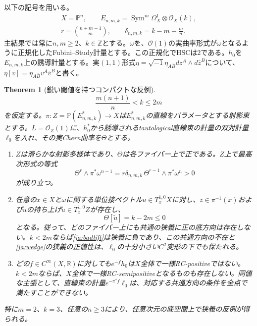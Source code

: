 \documentclass[12pt]{amsart}
\newtheorem{thm}{Theorem}[section]
\theoremstyle{definition}
\theoremstyle{remark}
\numberwithin{equation}{section}
\DeclareMathOperator{\Sym}{Sym}
\newcommand{\R}{\mathbb{R}}
\newcommand{\Z}{\mathbb{Z}}
\newcommand{\E}{E_{n,m,k}}
\newcommand{\Pp}{\mathbb P}
\newcommand{\cst}{\delta_{n,m,k}}
\newcommand{\jref}[1]{\eqref{ja:#1}}
\begin{document}
以下の記号を用いる。
\begin{equation}\label{ja:parameters}
\begin{gathered}
X=\Pp^n,\qquad
\E=\Sym^m\Omega_X^1\otimes\mathcal O_X(k),\\
r=\binom{n+m-1}{m},\qquad
\cst=k-m-\frac mn.
\end{gathered}
\end{equation}
主結果では常に$n,m\ge2$、$k\in\Z$とする。$\omega$を、$\mathcal O(1)$の実曲率形式が$\omega$となるように正規化したFubini--Study計量とする。この正規化でHSCは$2$である。$h_0$を$\E$上の誘導計量とする。実$(1,1)$形式$\eta=\sqrt{-1}\eta_{A\bar B}dz^A\wedge d\bar z^B$について、$\eta[v]=\eta_{A\bar B}v^A\bar v^B$と書く。

\begin{thm}[鋭い閾値を持つコンパクトな反例]\label{ja:main}
\begin{equation}\label{ja:gap}
\frac{m(n+1)}n<k\le2m
\end{equation}
を仮定する。$\pi:Z=\Pp(\E^*)\to X$は$\E^*$の直線をパラメータとする射影束とする。$L=\mathcal O_Z(1)$に、$h_0^*$から誘導されるtautological直線束の計量の双対計量$\ell_0$を入れ、その実Chern曲率を$\Theta$とする。
\begin{enumerate}
\item $Z$は滑らかな射影多様体であり、$\Theta$は各ファイバー上で正である。$Z$上で最高次形式の等式
\begin{equation}\label{ja:wedge}
\Theta^r\wedge\pi^*\omega^{n-1}
=r\cst\,\Theta^{r-1}\wedge\pi^*\omega^n>0
\end{equation}
が成り立つ。
\item 任意の$x\in X$と$\omega$に関する単位接ベクトル$u\in T_x^{1,0}X$に対し、$z\in\pi^{-1}(x)$および$u$の持ち上げ$\widetilde u\in T_z^{1,0}Z$が存在し、
\begin{equation}\label{ja:badlift}
\Theta[\widetilde u]=k-2m\le0
\end{equation}
となる。従って、どのファイバー上にも共通の狭義に正の底方向は存在しない。$k<2m$ならば\jref{badlift}は狭義に負であり、この共通方向の不在と\jref{wedge}の狭義の正値性は、$\ell_0$の十分小さい$C^2$変形の下でも保たれる。
\item どの$f\in C^\infty(X,\R)$に対しても$e^{-f}h_0$は$X$全体で一様RC-positiveではない。$k<2m$ならば、$X$全体で一様RC-semipositiveとなるものも存在しない。同値な主張として、直線束の計量$e^{-\pi^*f}\ell_0$は、対応する共通方向の条件を全点で満たすことができない。
\end{enumerate}
特に$m=2$、$k=3$、任意の$n\ge3$により、任意次元の底空間上で狭義の反例が得られる。
\end{thm}
\end{document}

